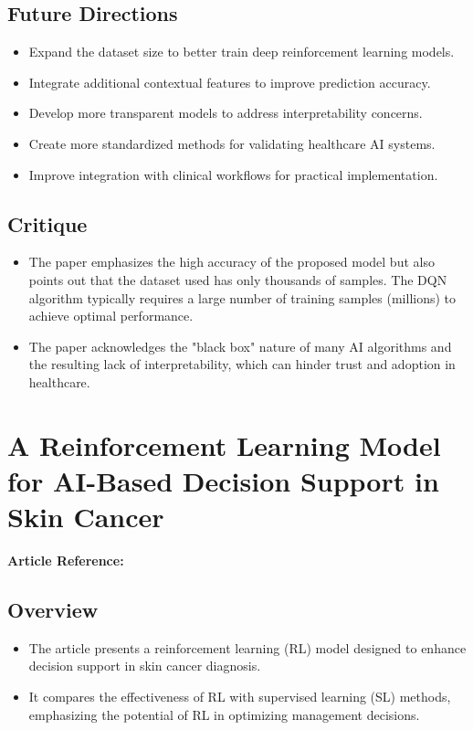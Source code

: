 \subsection*{Future Directions}
\begin{itemize}
    \item Expand the dataset size to better train deep reinforcement learning models.
    \item Integrate additional contextual features to improve prediction accuracy.
    \item Develop more transparent models to address interpretability concerns.
    \item Create more standardized methods for validating healthcare AI systems.
    \item Improve integration with clinical workflows for practical implementation.
\end{itemize}

\subsection*{Critique}
\begin{itemize}
    \item The paper emphasizes the high accuracy of the proposed model but also points out that the dataset used has only thousands of samples. The DQN algorithm typically requires a large number of training samples (millions) to achieve optimal performance.
    \item The paper acknowledges the "black box" nature of many AI algorithms and the resulting lack of interpretability, which can hinder trust and adoption in healthcare.
\end{itemize}

\section{A Reinforcement Learning Model for AI-Based Decision Support in Skin Cancer}
\textbf{Article Reference:} \cite{article_11}

\subsection*{Overview}
\begin{itemize}
    \item The article presents a reinforcement learning (RL) model designed to enhance decision support in skin cancer diagnosis.
    \item It compares the effectiveness of RL with supervised learning (SL) methods, emphasizing the potential of RL in optimizing management decisions.
\end{itemize}

